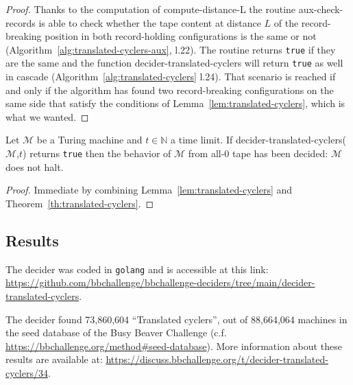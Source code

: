 \begin{proof}
Thanks to the computation of {\sc compute-distance-L} the routine {\sc aux-check-records} is able to check whether the tape content at distance $L$ of the record-breaking position in both record-holding configurations is the same or not (Algorithm~\ref{alg:translated-cyclers-aux}, l.22). The routine returns \texttt{true} if they are the same and the function {\sc decider-translated-cyclers} will return \texttt{true} as well in cascade (Algorithm~\ref{alg:translated-cyclers} l.24). That scenario is reached if and only if the algorithm has found two record-breaking configurations on the same side that satisfy the conditions of Lemma~\ref{lem:translated-cyclers}, which is what we wanted.

\end{proof}

\begin{corollary}\normalfont
  Let $\mathcal{M}$ be a Turing machine and $t \in \mathbb{N}$ a time limit. If {\sc decider-translated-cyclers}($\mathcal{M}$,$t$) returns \texttt{true} then the behavior of $\mathcal{M}$ from all-0 tape has been decided: $\mathcal{M}$ does not halt.
\end{corollary}
\begin{proof}
Immediate by combining Lemma~\ref{lem:translated-cyclers} and Theorem~\ref{th:translated-cyclers}.
\end{proof}

\subsection{Results}

The decider was coded in \texttt{golang} and is accessible at this link: \url{https://github.com/bbchallenge/bbchallenge-deciders/tree/main/decider-translated-cyclers}.

The decider found 73,860,604 ``Translated cyclers'', out of 88,664,064 machines in the seed database of the Busy Beaver Challenge (c.f. \url{https://bbchallenge.org/method#seed-database}). More information about these results are available at: \url{https://discuss.bbchallenge.org/t/decider-translated-cyclers/34}.